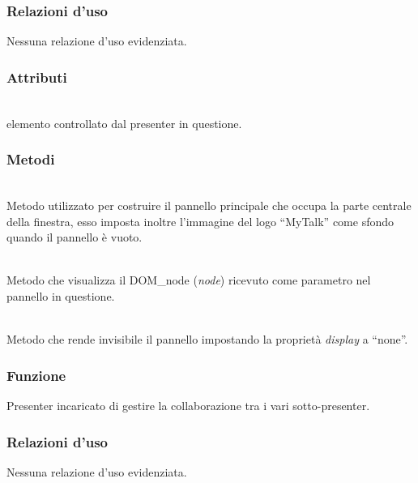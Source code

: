 \subsubsection*{Relazioni d'uso}
Nessuna relazione d'uso evidenziata.

\subsubsection*{Attributi}
\begin{description}
\item{}\\
  elemento controllato dal presenter in questione.
\end{description}

\subsubsection*{Metodi}
\begin{description}
\item{}\\
Metodo utilizzato per costruire il pannello principale che occupa la parte centrale della finestra, esso imposta inoltre l'immagine del logo ``MyTalk'' come sfondo quando il pannello è vuoto.

\item{}\\
Metodo che visualizza il DOM\_node (\textit{node}) ricevuto come parametro nel pannello in questione.
	
\item{}\\
Metodo che rende invisibile il pannello impostando la proprietà \textit{display} a ``none''.

\end{description}


\subsubsection*{Funzione}
Presenter incaricato di gestire la collaborazione tra i vari sotto-presenter.

\subsubsection*{Relazioni d'uso}
Nessuna relazione d'uso evidenziata.

